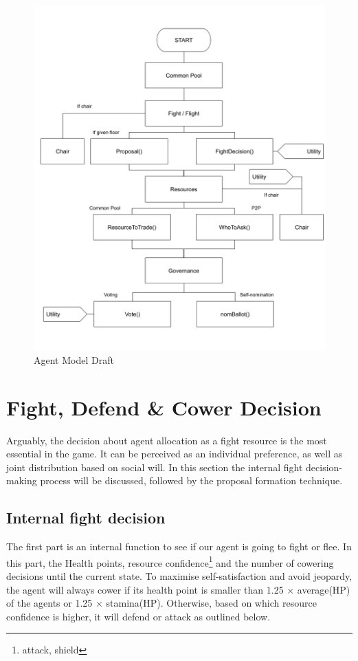 \begin{figure}[H]
    \includegraphics[scale=0.35]{006_team_3_agent_design/FIGS/diagram.png}
    \caption{Agent Model Draft}
    \label{fig:agent_model}
\end{figure}

\clearpage


\section{Fight, Defend \& Cower Decision}



Arguably, the decision about agent allocation as a fight resource is the most essential in the game. It can be perceived as an individual preference, as well as joint distribution based on social will. In this section the internal fight decision-making process will be discussed, followed by the proposal formation technique.


\subsection{Internal fight decision}
    The first part is an internal function to see if our agent is going to fight or flee. In this part, the Health points, resource confidence\footnote{attack, shield} and the number of cowering decisions until the current state.
    To maximise self-satisfaction and avoid jeopardy, the agent will always cower if its health point is smaller  than  1.25 $\times$ average(HP) of the agents or 1.25 $\times$ stamina(HP). Otherwise, based on which resource confidence is higher, it will defend or attack as outlined below.

